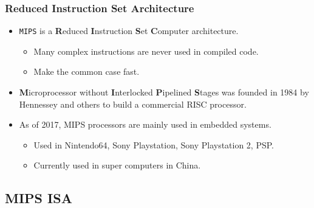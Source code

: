 \documentclass{beamer}
\begin{document}
\begin{frame}%
\frametitle{Reduced Instruction Set Architecture}

\begin{itemize}

\item \texttt{MIPS} is a \textbf{R}educed \textbf{I}nstruction \textbf{S}et \textbf{C}omputer architecture.
  \begin{itemize}
  \item Many complex instructions are never used in compiled code.
  \item Make the common case fast.
  \end{itemize}

  \vspace{0.3cm}

\item \textbf{M}icroprocessor without \textbf{I}nterlocked \textbf{P}ipelined \textbf{S}tages was founded
  in 1984 by Hennessey and others to build a commercial RISC processor.

  \vspace{0.3cm}

\item As of 2017, MIPS processors are mainly used in embedded systems.
  \begin{itemize}
  \item Used in Nintendo64, Sony Playstation, Sony Playstation 2, PSP.
  \item Currently used in super computers in China.
  \end{itemize}

\end{itemize}

\end{frame}

\subsection{MIPS ISA}

\lstset{language=[mips]Assembler}
\end{document}

